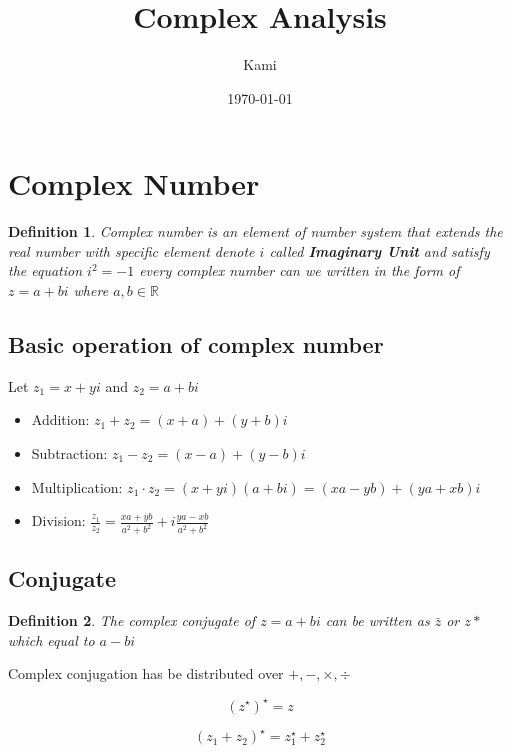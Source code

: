 \documentclass{article}
\title{Complex Analysis}
\author{Kami}
\date{\today}
\newtheorem{definition}{Definition}
\begin{document}
\maketitle

\section{Complex Number}

\begin{definition}
    Complex number is an element of number system that extends the real number with specific
    element denote $i$ called \textbf{Imaginary Unit} and satisfy the equation $i^2 = -1$
    every complex number can we written in the form of $z = a + bi$ where $a,b \in \mathbb{R}$
\end{definition}

\subsection{Basic operation of complex number}
Let $z_1 = x + yi$ and $z_2 = a + bi$

\begin{itemize}
    \item Addition: $z_1 + z_2 = (x + a) + (y + b)i$
    \item Subtraction: $z_1 - z_2 = (x - a) + (y - b)i$
    \item Multiplication: $z_1 \cdot z_2 = (x + yi)(a + bi) = (xa - yb) + (ya + xb)i$
    \item Division: $\frac{z_1}{z_2} = \frac{xa + yb}{a^2 + b^2} + i\frac{ya - xb}{a^2+b^2}$
\end{itemize}

\subsection{Conjugate}
\begin{definition}
    The complex conjugate of $z=a+bi$ can be written as $\bar{z}$ or $z*$ which equal to $a-bi$
\end{definition}

Complex conjugation has be distributed over $+, -, \times, \div$

\begin{equation}
    (z^\star)^\star= z
    \label{eq:Complex conjugation negation}
\end{equation}

\begin{equation}
    (z_1 + z_2)^\star = z_1^\star + z_2^\star
    \label{eq:Complex conjugation over addition}
\end{equation}
\end{document}
